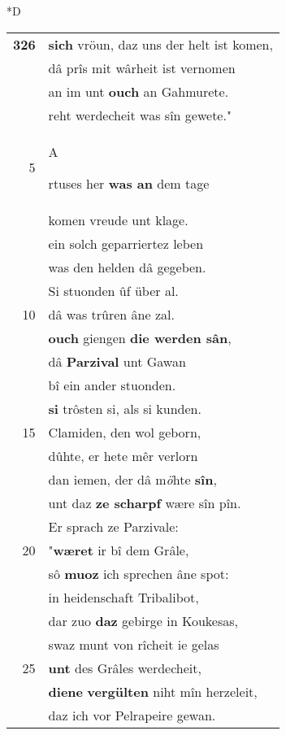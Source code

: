 \documentclass[8pt,a4paper,notitlepage]{article}
\begin{document}
\begin{table}[ht]
\begin{minipage}[t]{0.5\linewidth}
\small
\begin{center}*D
\end{center}
\begin{tabular}{rl}
\textbf{326} & \textbf{sich} vröun, daz uns der helt ist komen,\\ 
 & dâ prîs mit wârheit ist vernomen\\ 
 & an im unt \textbf{ouch} an Gahmurete.\\ 
 & reht werdecheit was sîn gewete."\\ 
5 & \begin{large}A\end{large}rtuses her \textbf{was an} dem tage\\ 
 & komen vreude unt klage.\\ 
 & ein solch geparriertez leben\\ 
 & was den helden dâ gegeben.\\ 
 & Si stuonden ûf über al.\\ 
10 & dâ was trûren âne zal.\\ 
 & \textbf{ouch} giengen \textbf{die werden sân},\\ 
 & dâ \textbf{Parzival} unt Gawan\\ 
 & bî ein ander stuonden.\\ 
 & \textbf{si} trôsten si, als si kunden.\\ 
15 & Clamiden, den wol geborn,\\ 
 & dûhte, er hete mêr verlorn\\ 
 & dan iemen, der dâ m\textit{ö}hte \textbf{sîn},\\ 
 & unt daz \textbf{ze scharpf} wære sîn pîn.\\ 
 & Er sprach ze Parzivale:\\ 
20 & "\textbf{wæret} ir bî dem Grâle,\\ 
 & sô \textbf{muoz} ich sprechen âne spot:\\ 
 & in heidenschaft Tribalibot,\\ 
 & dar zuo \textbf{daz} gebirge in Koukesas,\\ 
 & swaz munt von rîcheit ie gelas\\ 
25 & \textbf{unt} des Grâles werdecheit,\\ 
 & \textbf{die}\textbf{ne} \textbf{vergülten} niht mîn herzeleit,\\ 
 & daz ich vor Pelrapeire gewan.\\ 

\end{tabular}
\end{minipage}
\end{table}
\end{document}
